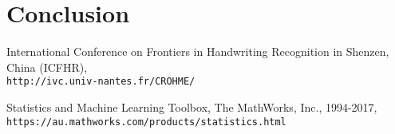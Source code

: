 \documentclass[twocolumn]{article}%
\begin{document}
	
	\section{Conclusion}
	
	\begin{thebibliography}{9}
		International Conference on Frontiers in Handwriting Recognition in Shenzen, China (ICFHR),
		\\\texttt{http://ivc.univ-nantes.fr/CROHME/}
		
		Statistics and Machine Learning Toolbox, The MathWorks, Inc., 1994-2017,
		\\\texttt{https://au.mathworks.com/products/statistics.html}
		
		
	\end{thebibliography}
\end{document}
